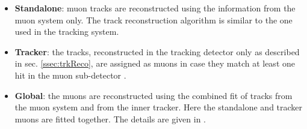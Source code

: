 \begin{itemize}
 \item \textbf{Standalone}: muon tracks are reconstructed using the information from the muon system only. The track reconstruction
 algorithm \cite{TWiki:GlobalMuon} is similar to the one used in the tracking system.
 
 \item \textbf{Tracker}: the tracks, reconstructed in the tracking detector only as described in sec. \ref{ssec:trkReco}, 
 are assigned as muons in case they match at least one hit in the muon sub-detector \cite{TWiki:GlobalMuon}.
 
 \item \textbf{Global}: the muons are reconstructed using 
 the combined fit of tracks from the muon system and from the inner tracker. Here the standalone and tracker muons are fitted together. The details are given
 in \cite{TWiki:GlobalMuon}.
\end{itemize}

